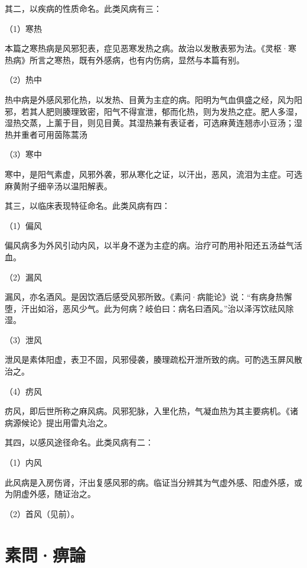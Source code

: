 \documentclass[draft,12pt]{ctexbook}
\begin{document}
其二，以疾病的性质命名。此类风病有三：

（1）寒热

本篇之寒热病是风邪犯表，症见恶寒发热之病。故治以发散表邪为法。《灵枢·寒热病》所言之寒热，既有外感病，也有内伤病，显然与本篇有别。

（2）热中

热中病是外感风邪化热，以发热、目黄为主症的病。阳明为气血俱盛之经，风为阳邪，若其人肥则腠理致密，阳气不得宣泄，郁而化热，则为发热之症。肥人多湿，湿热交蒸，上薰于目，则见目黄。其湿热兼有表证者，可选麻黄连翘赤小豆汤；湿热并重者可用茵陈蒿汤

（3）寒中

寒中，是阳气素虚，风邪外袭，邪从寒化之证，以汗出，恶风，流泪为主症。可选麻黄附子细辛汤以温阳解表。

其三，以临床表现特征命名。此类风病有四：

（1）偏风

偏风病多为外风引动内风，以半身不遂为主症的病。治疗可酌用补阳还五汤益气活血。

（2）漏风

漏风，亦名酒风。是因饮酒后感受风邪所致。《素问·病能论》说：“有病身热懈堕，汗出如浴，恶风少气。此为何病？岐伯曰：病名曰酒风。”治以泽泻饮祛风除湿。

（3）泄风

泄风是素体阳虚，表卫不固，风邪侵袭，腠理疏松开泄所致的病。可酌选玉屏风散治之。

（4）疠风

疠风，即后世所称之麻风病。风邪犯脉，入里化热，气凝血热为其主要病机。《诸病源候论》提出用雷丸治之。

其四，以感风途径命名。此类风病有二：

（1）内风

此风病是入房伤肾，汗出复感风邪的病。临证当分辨其为气虚外感、阳虚外感，或为阴虚外感，随证治之。

（2）首风（见前）。

\section{素問·痹論}%

\end{document}

